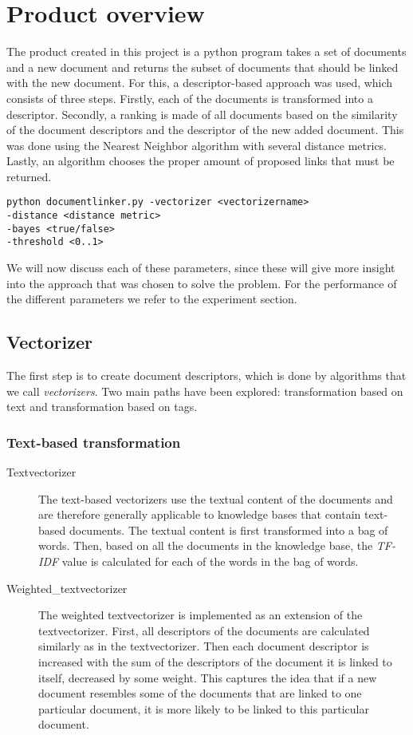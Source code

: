 \section{Product overview}

The product created in this project is a python program takes a set of documents and a new document and returns the subset of documents that should be linked with the new document. For this, a descriptor-based approach was used, which consists of three steps. Firstly, each of the documents is transformed into a descriptor. Secondly, a ranking is made of all documents based on the similarity of the document descriptors and the descriptor of the new added document. This was done using the Nearest Neighbor algorithm with several distance metrics. Lastly, an algorithm chooses the proper amount of proposed links that must be returned.

\begin{lstlisting}
python documentlinker.py -vectorizer <vectorizername> 
-distance <distance metric> 
-bayes <true/false>
-threshold <0..1>
\end{lstlisting}

We will now discuss each of these parameters, since these will give more insight into the approach that was chosen to solve the problem. For the performance of the different parameters we refer to the experiment section. 

\subsection{Vectorizer}
The first step is to create document descriptors, which is done by algorithms that we call \emph{vectorizers}. Two main paths have been explored: transformation based on text and transformation based on tags.

\subsubsection{Text-based transformation}
\begin{description}
\item [Textvectorizer] The text-based vectorizers use the textual content of the documents and are therefore generally applicable to knowledge bases that contain text-based documents. The textual content is first transformed into a bag of words. Then, based on all the documents in the knowledge base, the \emph{TF-IDF} value is calculated for each of the words in the bag of words.  

\item[Weighted\_textvectorizer] The weighted textvectorizer is implemented as an extension of the textvectorizer. First, all descriptors of the documents are calculated similarly as in the textvectorizer. Then each document descriptor is increased with the sum of the descriptors of the document it is linked to itself, decreased by some weight. This captures the idea that if a new document resembles some of the documents that are linked to one particular document, it is more likely to be linked to this particular document. 
\end{description}

